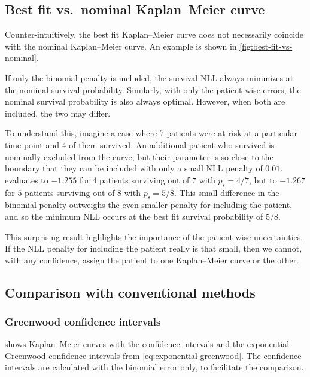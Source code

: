 \documentclass[article]{jss}
\newcommand{\KM}{Kaplan--Meier} %
\begin{document}
\subsection%
[Best fit vs. nominal \KM{} curve]%
{Best fit vs.\ nominal \KM{} curve}

Counter-intuitively, the best fit \KM{} curve does not necessarily coincide with the nominal \KM{} curve. An example is shown in \cref{fig:best-fit-vs-nominal}.

If only the binomial penalty is included, the survival NLL always minimizes at the nominal survival probability. Similarly, with only the patient-wise errors, the nominal survival probability is also always optimal. However, when both are included, the two may differ.

To understand this, imagine a case where 7 patients were at risk at a particular time point and 4 of them survived. An additional patient who survived is nominally excluded from the curve, but their parameter is so close to the boundary that they can be included with only a small NLL penalty of \(0.01\)\@.  evaluates to \(-1.255\) for \(4\) patients surviving out of \(7\) with \(p_\text{s}=4/7\), but to \(-1.267\) for \(5\) patients surviving out of \(8\) with \(p_\text{s}=5/8\). This small difference in the binomial penalty outweighs the even smaller penalty for including the patient, and so the minimum NLL occurs at the best fit survival probability of \(5/8\).

This surprising result highlights the importance of the patient-wise uncertainties. If the NLL penalty for including the patient really is that small, then we cannot, with any confidence, assign the patient to one \KM{} curve or the other.

\subsection{Comparison with conventional methods}\label{sec:compare-to-conventional}

\subsubsection{Greenwood confidence intervals}\label{sec:compare-to-greenwood}

 shows \KM{} curves with the  confidence intervals and the exponential Greenwood confidence intervals from \cref{eq:exponential-greenwood}. The  confidence intervals are calculated with the binomial error only, to facilitate the comparison.
\end{document}
